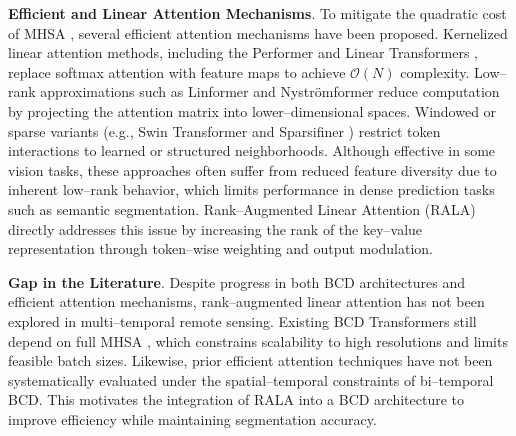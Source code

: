 \noindent \textbf{Efficient and Linear Attention Mechanisms}.  
To mitigate the quadratic cost of MHSA \cite{Vaswani2017Attention}, several efficient attention mechanisms have been proposed. Kernelized linear attention methods, including the Performer \cite{Choromanski2021Performer} and Linear Transformers \cite{Katharopoulos2020Linear}, replace softmax attention with feature maps to achieve $\mathcal{O}(N)$ complexity. Low–rank approximations such as Linformer \cite{Wang2020Linformer} and Nyströmformer \cite{Xiong2021Nystromformer} reduce computation by projecting the attention matrix into lower–dimensional spaces. Windowed or sparse variants (e.g., Swin Transformer \cite{Liu2021Swin} and Sparsifiner \cite{Wei2023Sparsifiner}) restrict token interactions to learned or structured neighborhoods. Although effective in some vision tasks, these approaches often suffer from reduced feature diversity due to inherent low–rank behavior, which limits performance in dense prediction tasks such as semantic segmentation. Rank–Augmented Linear Attention (RALA) \cite{Fan2025RALA} directly addresses this issue by increasing the rank of the key–value representation through token–wise weighting and output modulation.

\noindent \textbf{Gap in the Literature}.  
Despite progress in both BCD architectures and efficient attention mechanisms, rank–augmented linear attention has not been explored in multi–temporal remote sensing. Existing BCD Transformers still depend on full MHSA \cite{Vaswani2017Attention}, which constrains scalability to high resolutions and limits feasible batch sizes. Likewise, prior efficient attention techniques have not been systematically evaluated under the spatial–temporal constraints of bi–temporal BCD. This motivates the integration of RALA into a BCD architecture to improve efficiency while maintaining segmentation accuracy.